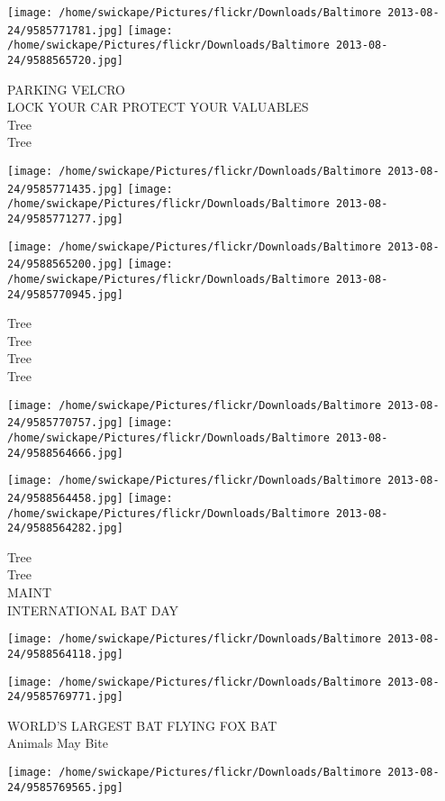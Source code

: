 \documentclass[10pt,letterpaper]{article}
\begin{document}
\texttt{[image: /home/swickape/Pictures/flickr/Downloads/Baltimore 2013-08-24/9585771781.jpg]}
\texttt{[image: /home/swickape/Pictures/flickr/Downloads/Baltimore 2013-08-24/9588565720.jpg]}

PARKING VELCRO\\
LOCK YOUR CAR PROTECT YOUR VALUABLES\\
Tree\\
Tree
\pagebreak

\texttt{[image: /home/swickape/Pictures/flickr/Downloads/Baltimore 2013-08-24/9585771435.jpg]}
\texttt{[image: /home/swickape/Pictures/flickr/Downloads/Baltimore 2013-08-24/9585771277.jpg]}

\texttt{[image: /home/swickape/Pictures/flickr/Downloads/Baltimore 2013-08-24/9588565200.jpg]}
\texttt{[image: /home/swickape/Pictures/flickr/Downloads/Baltimore 2013-08-24/9585770945.jpg]}

Tree\\
Tree\\
Tree\\
Tree
\pagebreak

\texttt{[image: /home/swickape/Pictures/flickr/Downloads/Baltimore 2013-08-24/9585770757.jpg]}
\texttt{[image: /home/swickape/Pictures/flickr/Downloads/Baltimore 2013-08-24/9588564666.jpg]}

\texttt{[image: /home/swickape/Pictures/flickr/Downloads/Baltimore 2013-08-24/9588564458.jpg]}
\texttt{[image: /home/swickape/Pictures/flickr/Downloads/Baltimore 2013-08-24/9588564282.jpg]}

Tree\\
Tree\\
MAINT\\
INTERNATIONAL BAT DAY
\pagebreak

\texttt{[image: /home/swickape/Pictures/flickr/Downloads/Baltimore 2013-08-24/9588564118.jpg]}

\vspace{0.25in}
\texttt{[image: /home/swickape/Pictures/flickr/Downloads/Baltimore 2013-08-24/9585769771.jpg]}

WORLD'S LARGEST BAT FLYING FOX BAT\\
Animals May Bite
\pagebreak

\texttt{[image: /home/swickape/Pictures/flickr/Downloads/Baltimore 2013-08-24/9585769565.jpg]}
\end{document}
